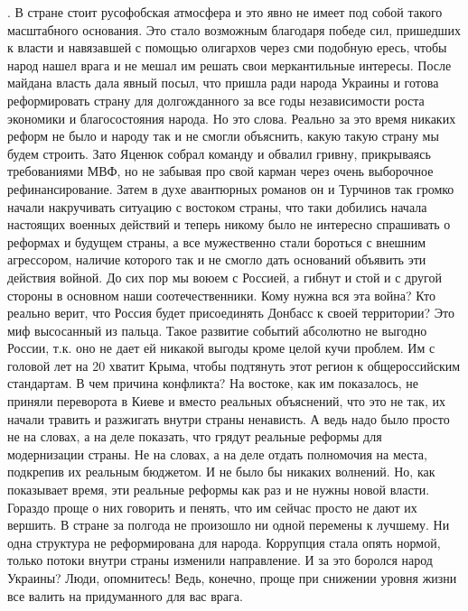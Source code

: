 \begin{itemize}
. В стране стоит русофобская атмосфера и это явно не имеет под собой такого
масштабного основания. Это стало возможным благодаря победе сил, пришедших к
власти и навязавшей с помощью олигархов через сми подобную ересь, чтобы народ
нашел врага и не мешал им решать свои меркантильные интересы. После майдана
власть дала явный посыл, что пришла ради народа Украины и готова реформировать
страну для долгожданного за все годы независимости роста экономики и
благосостояния народа. Но это слова. Реально за это время никаких реформ не
было и народу так и не смогли объяснить, какую такую страну мы будем строить.
Зато Яценюк собрал команду и обвалил гривну, прикрываясь требованиями МВФ, но
не забывая про свой карман через очень выборочное рефинансирование. Затем в
духе авантюрных романов он и Турчинов так громко начали накручивать ситуацию с
востоком страны, что таки добились начала настоящих военных действий и теперь
никому было не интересно спрашивать о реформах и будущем страны, а все
мужественно стали бороться с внешним агрессором, наличие которого так и не
смогло дать оснований объявить эти действия войной. До сих пор мы воюем с
Россией, а гибнут и стой и с другой стороны в основном наши соотечественники.
Кому нужна вся эта война? Кто реально верит, что Россия будет присоединять
Донбасс к своей территории? Это миф высосанный из пальца. Такое развитие
событий абсолютно не выгодно России, т.к. оно не дает ей никакой выгоды кроме
целой кучи проблем. Им с головой лет на 20 хватит Крыма, чтобы подтянуть этот
регион к общероссийским стандартам. В чем причина конфликта? На востоке, как им
показалось, не приняли переворота в Киеве и вместо реальных объяснений, что это
не так, их начали травить и разжигать внутри страны ненависть. А ведь надо было
просто не на словах, а на деле показать, что грядут реальные реформы для
модернизации страны. Не на словах, а на деле отдать полномочия на места,
подкрепив их реальным бюджетом. И не было бы никаких волнений. Но, как
показывает время, эти реальные реформы как раз и не нужны новой власти. Гораздо
проще о них говорить и пенять, что им сейчас просто не дают их вершить. В
стране за полгода не произошло ни одной перемены к лучшему. Ни одна структура
не реформирована для народа. Коррупция стала опять нормой, только потоки внутри
страны изменили направление. И за это боролся народ Украины? Люди, опомнитесь!
Ведь, конечно, проще при снижении уровня жизни все валить на придуманного для
вас врага.



\end{itemize}
